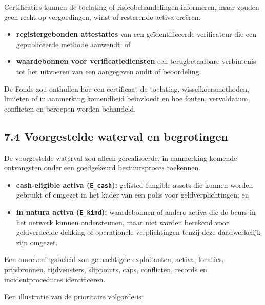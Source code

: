 \documentclass[11pt]{article}
\begin{document}
Certificaties kunnen de toelating of risicobehandelingen informeren, maar zouden geen recht op vergoedingen, winst of resterende activa creëren.

\begin{itemize}[leftmargin=*]
\item \textbf{registergebonden attestaties} van een geïdentificeerde verificateur die een gepubliceerde methode aanwendt; of
\item \textbf{waardebonnen voor verificatiediensten} een terugbetaalbare verbintenis tot het uitvoeren van een aangegeven audit of beoordeling.
\end{itemize}
De Fonds zou onthullen hoe een certificaat de toelating, wisselkoersmethoden, limieten of in aanmerking komendheid beïnvloedt en hoe fouten, vervaldatum, conflicten en beroepen worden behandeld.

\subsection*{7.4 Voorgestelde waterval en begrotingen}

De voorgestelde waterval zou alleen gerealiseerde, in aanmerking komende ontvangsten onder een goedgekeurd bestuursproces toekennen.

\begin{itemize}[leftmargin=*]
\item \textbf{cash-eligible activa (\texttt{E\_cash}):} gelisted fungible assets die kunnen worden gebruikt of omgezet in het kader van een polis voor geldverplichtingen; en
\item \textbf{in natura activa (\texttt{E\_kind}):} waardebonnen of andere activa die de beurs in het netwerk kunnen ondersteunen, maar niet worden berekend voor geldverdeelde dekking of operationele verplichtingen tenzij deze daadwerkelijk zijn omgezet.
\end{itemize}
Een omrekeningsbeleid zou gemachtigde exploitanten, activa, locaties, prijsbronnen, tijdvensters, slippoints, caps, conflicten, records en incidentprocedures identificeren.

Een illustratie van de prioritaire volgorde is:
\end{document}
